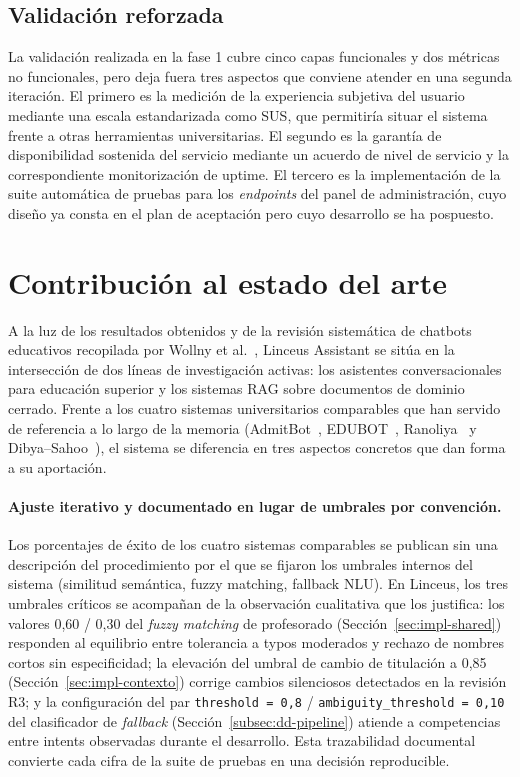 \subsection{Validación reforzada}\label{subsec:conc-fut-validacion}

La validación realizada en la fase 1 cubre cinco capas funcionales y dos métricas no funcionales, pero deja fuera tres aspectos que conviene atender en una segunda iteración. El primero es la medición de la experiencia subjetiva del usuario mediante una escala estandarizada como SUS, que permitiría situar el sistema frente a otras herramientas universitarias. El segundo es la garantía de disponibilidad sostenida del servicio mediante un acuerdo de nivel de servicio y la correspondiente monitorización de uptime. El tercero es la implementación de la suite automática de pruebas para los \textit{endpoints} del panel de administración, cuyo diseño ya consta en el plan de aceptación pero cuyo desarrollo se ha pospuesto.

\section{Contribución al estado del arte}\label{sec:conc-contribucion-arte}

A la luz de los resultados obtenidos y de la revisión sistemática de chatbots educativos recopilada por Wollny et al.~\cite{wollny2021survey}, Linceus Assistant se sitúa en la intersección de dos líneas de investigación activas: los asistentes conversacionales para educación superior y los sistemas RAG sobre documentos de dominio cerrado. Frente a los cuatro sistemas universitarios comparables que han servido de referencia a lo largo de la memoria (AdmitBot~\cite{gupta2019admitbot}, EDUBOT~\cite{colace2018edubot}, Ranoliya~\cite{ranoliya2017chatbot} y Dibya--Sahoo~\cite{dibya2021chatbot}), el sistema se diferencia en tres aspectos concretos que dan forma a su aportación.

\paragraph{Ajuste iterativo y documentado en lugar de umbrales por convención.} Los porcentajes de éxito de los cuatro sistemas comparables se publican sin una descripción del procedimiento por el que se fijaron los umbrales internos del sistema (similitud semántica, fuzzy matching, fallback NLU). En Linceus, los tres umbrales críticos se acompañan de la observación cualitativa que los justifica: los valores 0,60 / 0,30 del \textit{fuzzy matching} de profesorado (Sección~\ref{sec:impl-shared}) responden al equilibrio entre tolerancia a typos moderados y rechazo de nombres cortos sin especificidad; la elevación del umbral de cambio de titulación a 0,85 (Sección~\ref{sec:impl-contexto}) corrige cambios silenciosos detectados en la revisión R3; y la configuración del par \texttt{threshold = 0,8} / \texttt{ambiguity\_threshold = 0,10} del clasificador de \textit{fallback} (Sección~\ref{subsec:dd-pipeline}) atiende a competencias entre intents observadas durante el desarrollo. Esta trazabilidad documental convierte cada cifra de la suite de pruebas en una decisión reproducible.

